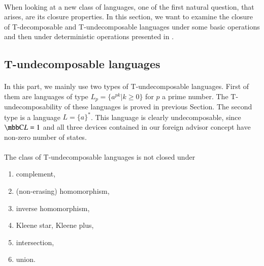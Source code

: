 \paragraph{}
When looking at a new class of languages, one of the first natural question, that arises, are its closure properties.  In this section, we want to examine the closure of T-decomposable and T-undecomposable languages under some basic operations and then under deterministic operations presented in \cite{AFDL}.

\subsection{T-undecomposable languages}
\paragraph{}
In this part, we mainly use two types of T-undecomposable languages. First of them are languages of type $L_p = \{ a^{pk} | k \geq 0 \}$ for $p$ a prime number. The T-undecomposability of these languages is proved in previous Section. The second type is a language $L = \{ a \}^*$. This language is clearly undecomposable, since $\C{L} = 1$ and all three devices contained in our foreign advisor concept have non-zero number of states.

\paragraph{}
\cveta The class of T-undecomposable languages is not closed under 
\begin{enumerate}
\item complement,
\item (non-erasing) homomorphism,
\item inverse homomorphism,
\item Kleene star, Kleene plus,
\item intersection,
\item union.
\end{enumerate}

